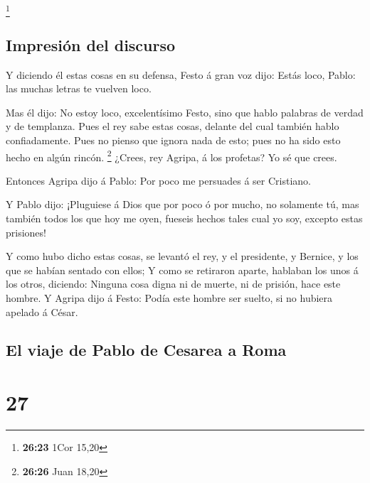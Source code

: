 \footnote{\textbf{26:23} 1Cor 15,20}

\hypertarget{impresiuxf3n-del-discurso}{%
\subsection{Impresión del discurso}\label{impresiuxf3n-del-discurso}}

 Y diciendo él estas cosas en su defensa, Festo á gran
voz dijo: Estás loco, Pablo: las muchas letras te vuelven loco.

 Mas él dijo: No estoy loco, excelentísimo Festo, sino
que hablo palabras de verdad y de templanza.  Pues el rey
sabe estas cosas, delante del cual también hablo confiadamente. Pues no
pienso que ignora nada de esto; pues no ha sido esto hecho en algún
rincón. \footnote{\textbf{26:26} Juan 18,20}  ¿Crees, rey
Agripa, á los profetas? Yo sé que crees.

 Entonces Agripa dijo á Pablo: Por poco me persuades á
ser Cristiano.

 Y Pablo dijo: ¡Pluguiese á Dios que por poco ó por
mucho, no solamente tú, mas también todos los que hoy me oyen, fueseis
hechos tales cual yo soy, excepto estas prisiones!

 Y como hubo dicho estas cosas, se levantó el rey, y el
presidente, y Bernice, y los que se habían sentado con ellos;
 Y como se retiraron aparte, hablaban los unos á los
otros, diciendo: Ninguna cosa digna ni de muerte, ni de prisión, hace
este hombre.  Y Agripa dijo á Festo: Podía este hombre
ser suelto, si no hubiera apelado á César.

\hypertarget{el-viaje-de-pablo-de-cesarea-a-roma}{%
\subsection{El viaje de Pablo de Cesarea a
Roma}\label{el-viaje-de-pablo-de-cesarea-a-roma}}

\hypertarget{section-26}{%
\section{27}\label{section-26}}

